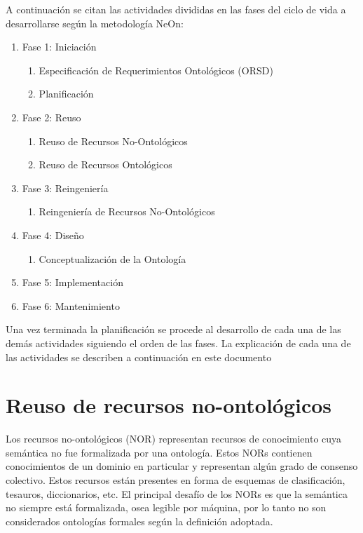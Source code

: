 A continuación se citan las actividades divididas en las fases del ciclo de vida a desarrollarse según la metodología NeOn:
\begin{enumerate}
\item Fase 1: Iniciación
\begin{enumerate}
\item Especificación de Requerimientos Ontológicos (ORSD)
\item Planificación 
\end{enumerate}
\item Fase 2: Reuso
\begin{enumerate}
\item Reuso de Recursos No-Ontológicos
\item Reuso de Recursos Ontológicos
\end{enumerate}
\item Fase 3: Reingeniería
\begin{enumerate}
\item Reingeniería de Recursos No-Ontológicos
\end{enumerate}
\item Fase 4: Diseño
\begin{enumerate}
\item Conceptualización de la Ontología
\end{enumerate}
\item Fase 5: Implementación
\item Fase 6: Mantenimiento

\end{enumerate}

Una vez terminada la planificación se procede al desarrollo de cada una de las demás actividades siguiendo el orden de las fases. La explicación de cada una de las actividades se describen a continuación en este documento

\section{Reuso de recursos no-ontológicos}
Los recursos no-ontológicos (NOR) representan recursos de conocimiento cuya semántica no fue formalizada por una ontología. Estos NORs contienen conocimientos de un dominio en particular y representan algún grado de consenso colectivo. Estos recursos están presentes en forma de esquemas de clasificación, tesauros, diccionarios, etc. El principal desafío de los NORs es que la semántica no siempre está formalizada, osea legible por máquina, por lo tanto no son considerados ontologías formales según la definición adoptada.


